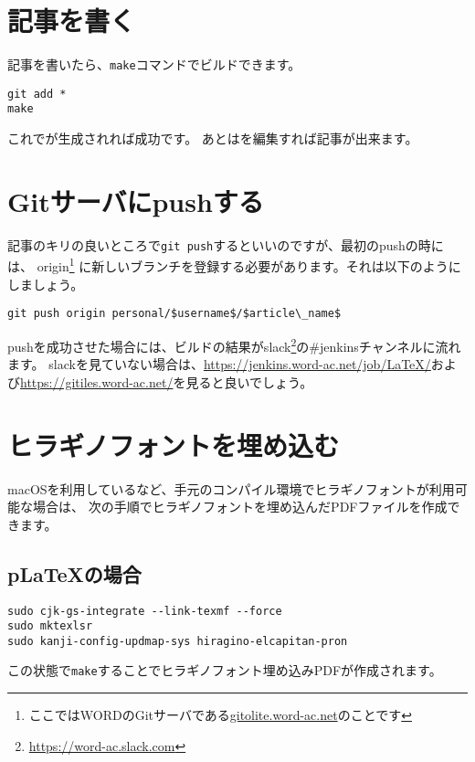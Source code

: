 \documentclass{word}
\begin{document}
\section{記事を書く}

記事を書いたら、\lstinline|make|コマンドでビルドできます。

\begin{lstlisting}
git add *
make
\end{lstlisting}

これでが生成されれば成功です。
あとはを編集すれば記事が出来ます。

\section{Gitサーバにpushする}

記事のキリの良いところで\lstinline|git push|するといいのですが、最初のpushの時には、
origin\footnote{ここではWORDのGitサーバである\url{gitolite.word-ac.net}のことです}%
に新しいブランチを登録する必要があります。それは以下のようにしましょう。

\begin{lstlisting}[mathescape]
git push origin personal/$username$/$article\_name$
\end{lstlisting}

pushを成功させた場合には、ビルドの結果がslack\footnote{\url{https://word-ac.slack.com}}の\#jenkinsチャンネルに流れます。
slackを見ていない場合は、\url{https://jenkins.word-ac.net/job/LaTeX/}および\url{https://gitiles.word-ac.net/}を見ると良いでしょう。

\section{ヒラギノフォントを埋め込む}

macOSを利用しているなど、手元のコンパイル環境でヒラギノフォントが利用可能な場合は、
次の手順でヒラギノフォントを埋め込んだPDFファイルを作成できます。

\subsection{p\LaTeX の場合}

\begin{lstlisting}
sudo cjk-gs-integrate --link-texmf --force
sudo mktexlsr  
sudo kanji-config-updmap-sys hiragino-elcapitan-pron
\end{lstlisting}
  
この状態で\lstinline|make|することでヒラギノフォント埋め込みPDFが作成されます。
\end{document}
